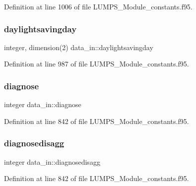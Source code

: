 Definition at line 1006 of file L\+U\+M\+P\+S\+\_\+\+Module\+\_\+constants.\+f95.

\mbox{\label{namespacedata__in_a0aac3556805fc05672641d8bb59558e2}} 
\subsubsection{\texorpdfstring{daylightsavingday}{daylightsavingday}}
{\footnotesize\ttfamily integer, dimension(2) data\+\_\+in\+::daylightsavingday}



Definition at line 987 of file L\+U\+M\+P\+S\+\_\+\+Module\+\_\+constants.\+f95.

\mbox{\label{namespacedata__in_aa277445969a4533d0db8452d45164762}} 
\subsubsection{\texorpdfstring{diagnose}{diagnose}}
{\footnotesize\ttfamily integer data\+\_\+in\+::diagnose}



Definition at line 842 of file L\+U\+M\+P\+S\+\_\+\+Module\+\_\+constants.\+f95.

\mbox{\label{namespacedata__in_a4083646fdfcd997307f15597aa4ec662}} 
\subsubsection{\texorpdfstring{diagnosedisagg}{diagnosedisagg}}
{\footnotesize\ttfamily integer data\+\_\+in\+::diagnosedisagg}



Definition at line 842 of file L\+U\+M\+P\+S\+\_\+\+Module\+\_\+constants.\+f95.

\mbox{\label{namespacedata__in_ae4cd527d8942c93e41e59584292f2d9c}} 

